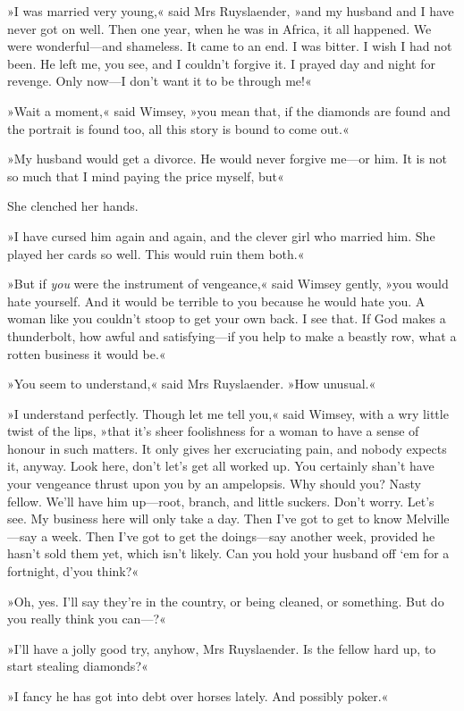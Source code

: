 »I was married very young,« said Mrs Ruyslaender, »and my husband and I have never got on well. Then one year, when he was in Africa, it all happened. We were wonderful—and shameless. It came to an end. I was bitter. I wish I had not been. He left me, you see, and I couldn't forgive it. I prayed day and night for revenge. Only now—I don't want it to be through me!«

»Wait a moment,« said Wimsey, »you mean that, if the diamonds are found and the portrait is found too, all this story is bound to come out.«

»My husband would get a divorce. He would never forgive me—or him. It is not so much that I mind paying the price myself, but\longdash«

She clenched her hands.

»I have cursed him again and again, and the clever girl who married him. She played her cards so well. This would ruin them both.«

»But if \textit{you} were the instrument of vengeance,« said Wimsey gently, »you would hate yourself. And it would be terrible to you because he would hate you. A woman like you couldn't stoop to get your own back. I see that. If God makes a thunderbolt, how awful and satisfying—if you help to make a beastly row, what a rotten business it would be.«

»You seem to understand,« said Mrs Ruyslaender. »How unusual.«

»I understand perfectly. Though let me tell you,« said Wimsey, with a wry little twist of the lips, »that it's sheer foolishness for a woman to have a sense of honour in such matters. It only gives her excruciating pain, and nobody expects it, anyway. Look here, don't let's get all worked up. You certainly shan't have your vengeance thrust upon you by an ampelopsis. Why should you? Nasty fellow. We'll have him up—root, branch, and little suckers. Don't worry. Let's see. My business here will only take a day. Then I've got to get to know Melville—say a week. Then I've got to get the doings—say another week, provided he hasn't sold them yet, which isn't likely. Can you hold your husband off `em for a fortnight, d'you think?«

»Oh, yes. I'll say they're in the country, or being cleaned, or something. But do you really think you can—?«

»I'll have a jolly good try, anyhow, Mrs Ruyslaender. Is the fellow hard up, to start stealing diamonds?«

»I fancy he has got into debt over horses lately. And possibly poker.«

